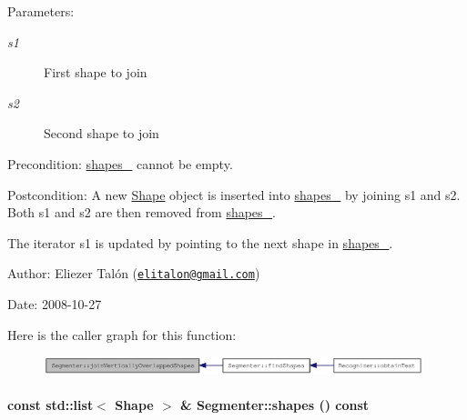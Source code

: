\begin{Desc}
\item[Parameters:]
\begin{description}
\item[{\em s1}]First shape to join \item[{\em s2}]Second shape to join\end{description}
\end{Desc}
\begin{Desc}
\item[Precondition:]\hyperlink{class_segmenter_41b94ede2829063e0937dc150756e77e}{shapes\_\-} cannot be empty.\end{Desc}
\begin{Desc}
\item[Postcondition:]A new \hyperlink{class_shape}{Shape} object is inserted into \hyperlink{class_segmenter_41b94ede2829063e0937dc150756e77e}{shapes\_\-} by joining s1 and s2. Both s1 and s2 are then removed from \hyperlink{class_segmenter_41b94ede2829063e0937dc150756e77e}{shapes\_\-}. 

The iterator s1 is updated by pointing to the next shape in \hyperlink{class_segmenter_41b94ede2829063e0937dc150756e77e}{shapes\_\-}.\end{Desc}
\begin{Desc}
\item[Author:]Eliezer Talón (\href{mailto:elitalon@gmail.com}{\tt elitalon@gmail.com}) \end{Desc}
\begin{Desc}
\item[Date:]2008-10-27 \end{Desc}


Here is the caller graph for this function:\nopagebreak
\begin{figure}[H]
\begin{center}
\leavevmode
\includegraphics[width=313pt]{class_segmenter_a6fc98922155143cf36f542118c33f3a_icgraph}
\end{center}
\end{figure}
\hypertarget{class_segmenter_7ddded12f26e94e6f5cba2752d2c4142}{
\paragraph[{shapes}]{\setlength{\rightskip}{0pt plus 5cm}const std::list$<$ {\bf Shape} $>$ \& Segmenter::shapes () const}\hfill}
\label{class_segmenter_7ddded12f26e94e6f5cba2752d2c4142}


